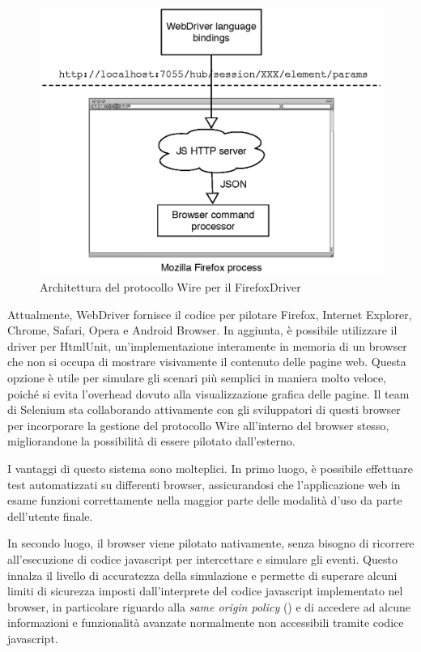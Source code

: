 \begin{figure}[htbp]
\begin{center}
\includegraphics[width=\textwidth]{images/webdriver_firefox.eps}
\caption{Architettura del protocollo Wire per il FirefoxDriver}
\label{fig:webdriverFirefox}
\end{center}
\end{figure} 

Attualmente, WebDriver fornisce il codice per pilotare Firefox, Internet Explorer, Chrome, Safari, Opera e Android Browser. In aggiunta, è possibile utilizzare il driver per HtmlUnit, un'implementazione interamente in memoria di un browser che non si occupa di mostrare visivamente il contenuto delle pagine web. Questa opzione è utile per simulare gli scenari più semplici in maniera molto veloce, poiché si evita l'overhead dovuto alla visualizzazione grafica delle pagine. 
Il team di Selenium sta collaborando attivamente con gli sviluppatori di questi browser per incorporare la gestione del protocollo Wire all'interno del browser stesso, migliorandone la possibilità di essere pilotato dall'esterno. 

I vantaggi di questo sistema sono molteplici. In primo luogo, è possibile effettuare test automatizzati su differenti browser, assicurandosi che l'applicazione web in esame funzioni correttamente nella maggior parte delle modalità d'uso da parte dell'utente finale. 

In secondo luogo, il browser viene pilotato nativamente, senza bisogno di ricorrere all'esecuzione di codice javascript per intercettare e simulare gli eventi. Questo innalza il livello di accuratezza della simulazione e permette di superare alcuni limiti di sicurezza imposti dall'interprete del codice javascript implementato nel browser, in particolare riguardo alla \emph{same origin policy} (\cite{sameOrigin}) e di accedere ad alcune informazioni e funzionalità avanzate normalmente non accessibili tramite codice javascript.

